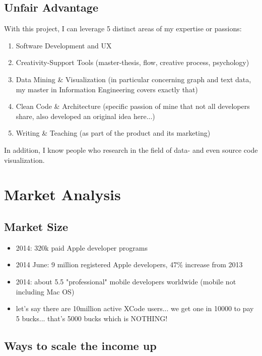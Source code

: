 \documentclass{article}
\begin{document}
\subsection{Unfair Advantage}

With this project, I can leverage 5 distinct areas of my expertise or passions:
\begin{enumerate}
	\item Software Development and UX
	\item Creativity-Support Tools (master-thesis, flow, creative process, psychology)
	\item Data Mining \& Visualization (in particular concerning graph and text data, my master in Information Engineering covers exactly that)
	\item Clean Code \& Architecture (specific passion of mine that not all developers share, also developed an original idea here...)
	\item Writing \& Teaching (as part of the product and its marketing)
\end{enumerate}

In addition, I know people who research in the field of data- and even source code visualization.

\section{Market Analysis}

\subsection{Market Size}

\begin{itemize}
	\item 2014: 320k paid Apple developer programs
	\item 2014 June: 9 million registered Apple developers, 47\% increase from 2013
	\item 2014: about 5.5 "professional" mobile developers worldwide (mobile not including Mac OS)
	\item let's say there are 10million active XCode users... we get one in 10000 to pay 5 bucks... that's 5000 bucks which is NOTHING!
\end{itemize}

\subsection{Ways to scale the income up}
\end{document}
